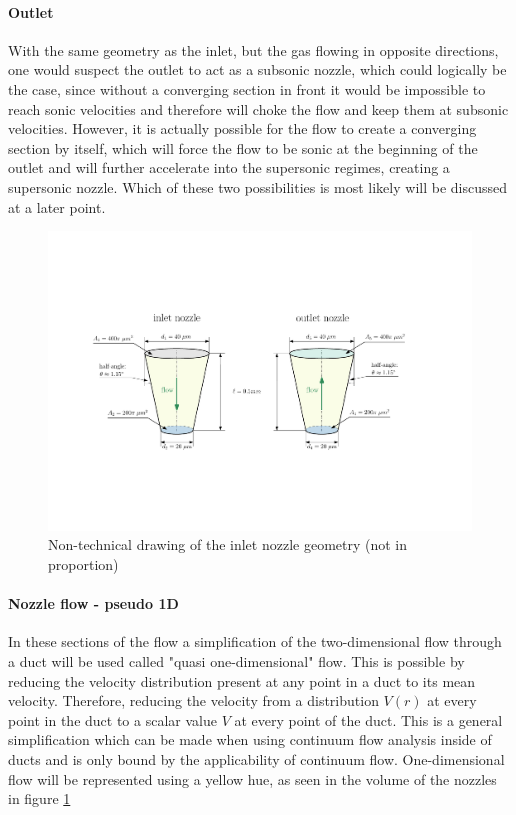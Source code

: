 	\paragraph{Outlet}
		With the same geometry as the inlet, but the gas flowing in opposite directions, one would suspect the outlet to act as a subsonic nozzle, which could logically be the case, since without a converging section in front it would be impossible to reach sonic velocities and therefore will choke the flow and keep them at subsonic velocities.
		However, it is actually possible for the flow to create a converging section by itself, which will force the flow to be sonic at the beginning of the outlet and will further accelerate into the supersonic regimes, creating a supersonic nozzle.
		Which of these two possibilities is most likely will be discussed at a later point.
	\begin{figure}[H]
	    \centering
	    \includegraphics[width=\textwidth]{src/03_analytical-work/fig_nozzle-geometries.pdf}
	    \caption{Non-technical drawing of the inlet nozzle geometry (not in proportion)}
	    \label{fig:geometry-nozzles}
	\end{figure}

	\paragraph{Nozzle flow - pseudo 1D}
		In these sections of the flow a simplification of the two-dimensional flow through a duct will be used called "quasi one-dimensional" flow.
		This is possible by reducing the velocity distribution present at any point in a duct to its mean velocity.
		Therefore, reducing the velocity from a distribution $V(r)$ at every point in the duct to a scalar value $V$ at every point of the duct.
		This is a general simplification which can be made when using continuum flow analysis inside of ducts and is only bound by the applicability of continuum flow.
		One-dimensional flow will be represented using a yellow hue, as seen in the volume of the nozzles in figure \ref{fig:geometry-nozzles}
		\newpage
